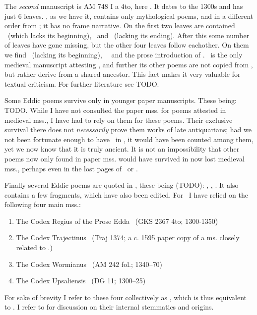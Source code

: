     The \emph{second} manuscript is AM 748 I a 4to, here \AM. It dates to the 1300s and has just 6 leaves. \AM, as we have it, contains only mythological poems, and in a different order from \Regius; it has no frame narrative. On the first two leaves are contained \Harbardsljod\ (which lacks its beginning), \Baldrsdraumar\ and \Skirnismal\ (lacking its ending). After this some number of leaves have gone missing, but the other four leaves follow eachother. On them we find \Vafthrudnismal\ (lacking its beginning), \Grimnismal\, \Hymiskvida\ and the prose introduction of \Volundarkvida. \AM\ is the only medieval manuscript attesting \Baldrsdraumar, and further its other poems are not copied from \Regius, but rather derive from a shared ancestor. This fact makes it very valuable for textual criticism. For further literature see TODO.

    Some Eddic poems survive only in younger paper manuscripts. These being: TODO. While I have not consulted the paper mss. for poems attested in medieval mss., I have had to rely on them for these poems. Their exclusive survival there does not \emph{necessarily} prove them works of late antiquarians; had we not been fortunate enough to have \Baldrsdraumar\ in \AM, it would have been counted among them, yet we now know that it is truly ancient. It is not an impossibility that other poems now only found in paper mss. would have survived in now lost medieval mss., perhaps even in the lost pages of \Regius\ or \AM.

    Finally several Eddic poems are quoted in \Gylfaginning, these being (TODO): \Voluspa, \Vafthrudnismal, \Grimnismal. It also contains a few fragments, which have also been edited. For \Gylfaginning\ I have relied on the following four main mss.:\begin{enumerate}
	   \item The Codex Regius of the Prose Edda \RegiusProse\ (GKS 2367 4to; 1300-1350)
     \item The Codex Trajectinus \Trajectinus\ (Traj 1374; a c. 1595 paper copy of a ms. closely related to \RegiusProse.)
     \item The Codex Wormianus \Wormianus\ (AM 242 fol.; 1340–70)
     \item The Codex Upsaliensis \Upsaliensis\ (DG 11; 1300–25)\end{enumerate}

     For sake of brevity I refer to these four collectively as \GylfMS, which is thus equivalent to \RegiusProse\Trajectinus\Wormianus\Upsaliensis. I refer to \textcite{Haukur2017} for discussion on their internal stemmatics and origins.

